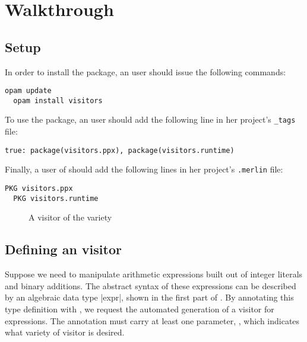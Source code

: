 \documentclass[11pt,a4paper,twoside]{article}
\begin{document}

\section{Walkthrough}


\subsection{Setup}
\label{sec:intro:setup}

In order to install the \visitors package, an \opam user should issue the
following commands:
\begin{lstlisting}[keywords={}]
  opam update
  opam install visitors
\end{lstlisting}
To use the package, an \ocamlbuild user should add the
following line in her project's \texttt{\_tags} file:
\begin{lstlisting}[keywords={}]
  true: package(visitors.ppx), package(visitors.runtime)
\end{lstlisting}
Finally, a user of \merlin should add the following lines in her project's
\texttt{.merlin} file:
\begin{lstlisting}[keywords={}]
  PKG visitors.ppx
  PKG visitors.runtime
\end{lstlisting}


\begin{figure}[t]
\vspace{-\baselineskip}
\caption{A visitor of the \iter variety}
\label{fig:expr00}
\end{figure}

\subsection{Defining an \iter visitor}
\label{sec:intro:iter:def}

Suppose we need to manipulate arithmetic expressions built out of integer
literals and binary additions. The abstract syntax of these expressions can be
described by an algebraic data type \oc|expr|, shown in the first part of
.
%
By annotating this type definition with \derivingvisitors, we request the
automated generation of a visitor for expressions. The annotation
\derivingvisitors must carry at least one parameter, \variety, which indicates
what variety of visitor is desired.
\end{document}
